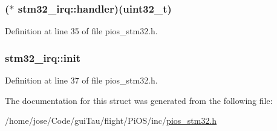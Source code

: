 \hypertarget{structstm32__irq_a4d9346b23aedfb76b515e0273e9321de}{
\subsubsection[{handler}]{($\ast$ stm32\-\_\-irq\-::handler)({\bf uint32\-\_\-t})}}\label{structstm32__irq_a4d9346b23aedfb76b515e0273e9321de}


Definition at line 35 of file pios\-\_\-stm32.\-h.

\hypertarget{structstm32__irq_aef3e74e894b4025023b6be1ab8b4348f}{
\subsubsection[{init}]{ stm32\-\_\-irq\-::init}}\label{structstm32__irq_aef3e74e894b4025023b6be1ab8b4348f}


Definition at line 37 of file pios\-\_\-stm32.\-h.



The documentation for this struct was generated from the following file\-:\begin{DoxyCompactItemize}
\item 
/home/jose/\-Code/gui\-Tau/flight/\-Pi\-O\-S/inc/\hyperlink{pios__stm32_8h}{pios\-\_\-stm32.\-h}\end{DoxyCompactItemize}
